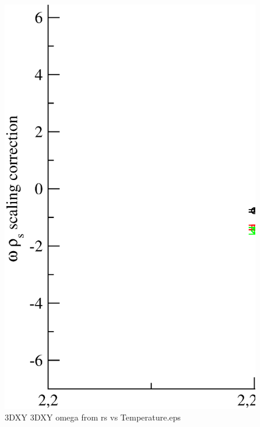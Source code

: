 \begin{figure}[!htpb]
  \centering
  \includegraphics[width=\textwidth]{./plots/3DXY/3DXY_omega_from_rs_vs_Temperature.eps}
  \caption{3DXY 3DXY omega from rs vs Temperature.eps}
\end{figure}

